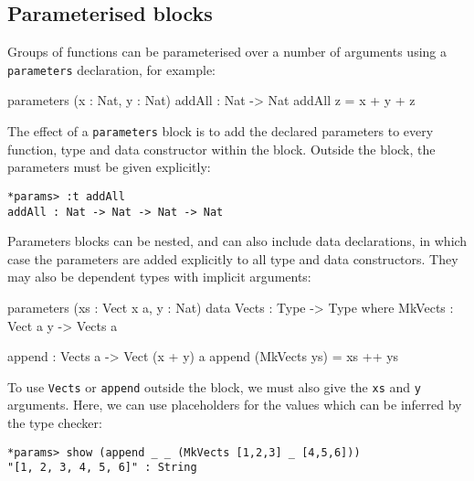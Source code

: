 \subsection{Parameterised blocks}

Groups of functions can be parameterised over a number of arguments using a
\texttt{parameters} declaration, for example:

\begin{code}
parameters (x : Nat, y : Nat)
    addAll : Nat -> Nat
    addAll z = x + y + z
\end{code}

\noindent
The effect of a \texttt{parameters} block is to add the declared parameters to every
function, type and data constructor within the block. Outside the block, the parameters
must be given explicitly:

\begin{lstlisting}
*params> :t addAll
addAll : Nat -> Nat -> Nat -> Nat
\end{lstlisting}

\noindent
Parameters blocks can be nested, and can also include data declarations, in
which case the parameters are added explicitly to all type and data
constructors. They may also be dependent types with implicit arguments:

\begin{code}
parameters (xs : Vect x a, y : Nat)
    data Vects : Type -> Type where
         MkVects : Vect a y -> Vects a
  
    append : Vects a -> Vect (x + y) a
    append (MkVects ys) = xs ++ ys
\end{code}

\noindent
To use \texttt{Vects} or \texttt{append} outside the block, we must also
give the \texttt{xs} and \texttt{y} arguments. Here, we can use placeholders for
the values which can be inferred by the type checker:

\begin{lstlisting}
*params> show (append _ _ (MkVects [1,2,3] _ [4,5,6]))
"[1, 2, 3, 4, 5, 6]" : String
\end{lstlisting}
